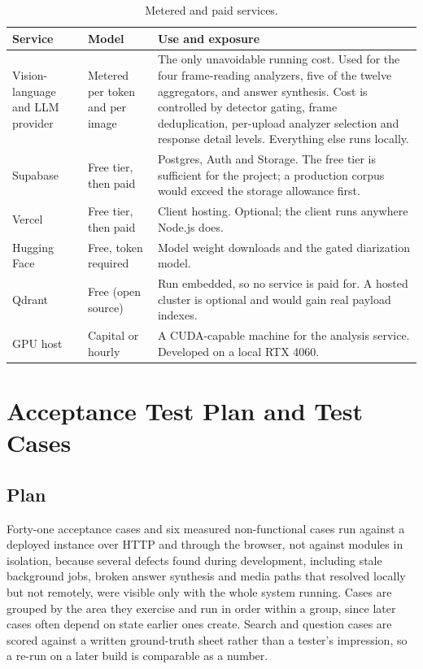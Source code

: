\documentclass[11pt,a4paper]{article}
\begin{document}
\begin{table}[htbp]
\centering
\small
\begin{tabularx}{\textwidth}{@{}L{2.4cm}L{1.9cm}X@{}}
\toprule
\textbf{Service} & \textbf{Model} & \textbf{Use and exposure} \\
\midrule
Vision-language and LLM provider & Metered per token and per image & The only unavoidable running cost. Used for the four frame-reading analyzers, five of the twelve aggregators, and answer synthesis. Cost is controlled by detector gating, frame deduplication, per-upload analyzer selection and response detail levels. Everything else runs locally. \\
Supabase & Free tier, then paid & Postgres, Auth and Storage. The free tier is sufficient for the project; a production corpus would exceed the storage allowance first. \\
Vercel & Free tier, then paid & Client hosting. Optional; the client runs anywhere Node.js does. \\
Hugging Face & Free, token required & Model weight downloads and the gated diarization model. \\
Qdrant & Free (open source) & Run embedded, so no service is paid for. A hosted cluster is optional and would gain real payload indexes. \\
GPU host & Capital or hourly & A CUDA-capable machine for the analysis service. Developed on a local RTX 4060. \\
\bottomrule
\end{tabularx}
\caption{Metered and paid services.}
\end{table}

\section{Acceptance Test Plan and Test Cases}

\subsection{Plan}

Forty-one acceptance cases and six measured non-functional cases run against a
deployed instance over HTTP and through the browser, not against modules in
isolation, because several defects found during development, including stale
background jobs, broken answer synthesis and media paths that resolved locally
but not remotely, were visible only with the whole system running. Cases are
grouped by the area they exercise and run in order within a group, since later
cases often depend on state earlier ones create. Search and question cases are
scored against a written ground-truth sheet rather than a tester's impression,
so a re-run on a later build is comparable as a number.
\end{document}
